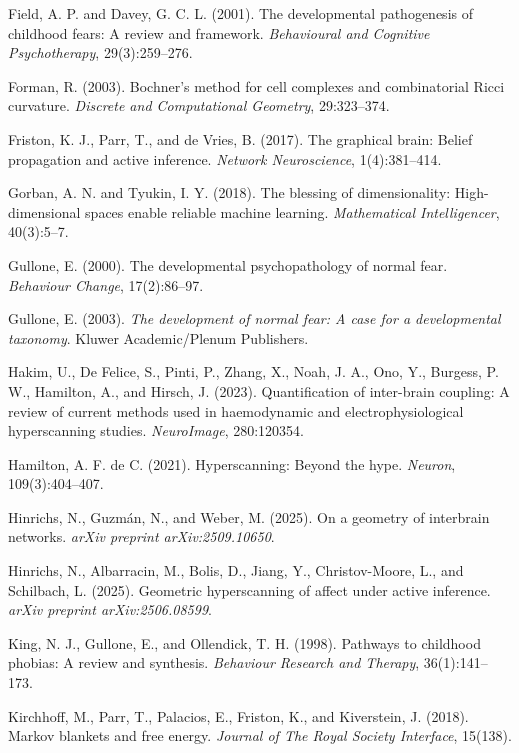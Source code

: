 \documentclass{article}
\theoremstyle{definition}
\begin{document}
\begin{thebibliography}{99}
Field, A. P. and Davey, G. C. L. (2001).
The developmental pathogenesis of childhood fears: A review and framework.
\textit{Behavioural and Cognitive Psychotherapy}, 29(3):259--276.

Forman, R. (2003).
Bochner’s method for cell complexes and combinatorial Ricci curvature.
\textit{Discrete and Computational Geometry}, 29:323–374.

Friston, K. J., Parr, T., and de Vries, B. (2017).
The graphical brain: Belief propagation and active inference.
\textit{Network Neuroscience}, 1(4):381–414.

Gorban, A. N. and Tyukin, I. Y. (2018).
The blessing of dimensionality: High-dimensional spaces enable reliable machine learning.
\textit{Mathematical Intelligencer}, 40(3):5–7.

Gullone, E. (2000).
The developmental psychopathology of normal fear.
\textit{Behaviour Change}, 17(2):86--97.

Gullone, E. (2003).
\textit{The development of normal fear: A case for a developmental taxonomy}.
Kluwer Academic/Plenum Publishers.

Hakim, U., De Felice, S., Pinti, P., Zhang, X., Noah, J. A., Ono, Y., Burgess, P. W., Hamilton, A., and Hirsch, J. (2023).
Quantification of inter-brain coupling: A review of current methods used in haemodynamic and electrophysiological hyperscanning studies.
\textit{NeuroImage}, 280:120354.

Hamilton, A. F. de C. (2021).
Hyperscanning: Beyond the hype.
\textit{Neuron}, 109(3):404–407.

Hinrichs, N., Guzmán, N., and Weber, M. (2025).
On a geometry of interbrain networks.
\textit{arXiv preprint arXiv:2509.10650}.

Hinrichs, N., Albarracin, M., Bolis, D., Jiang, Y., Christov-Moore, L., and Schilbach, L. (2025).
Geometric hyperscanning of affect under active inference.
\textit{arXiv preprint arXiv:2506.08599}.

King, N. J., Gullone, E., and Ollendick, T. H. (1998).
Pathways to childhood phobias: A review and synthesis.
\textit{Behaviour Research and Therapy}, 36(1):141--173.

Kirchhoff, M., Parr, T., Palacios, E., Friston, K., and Kiverstein, J. (2018).
Markov blankets and free energy.
\textit{Journal of The Royal Society Interface}, 15(138).


\end{thebibliography}
\end{document}
